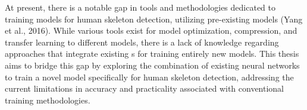 At present, there is a notable gap in tools and methodologies dedicated to training models for human skeleton detection, utilizing pre-existing models (\scc Yang et al., 2016). While various tools exist for model optimization, compression, and transfer learning to different models, there is a lack of knowledge regarding approaches that integrate existing \NN\-s for training entirely new models. This thesis aims to bridge this gap by exploring the combination of existing neural networks to train a novel model specifically for human skeleton detection, addressing the current limitations in accuracy and practicality associated with conventional training methodologies.

